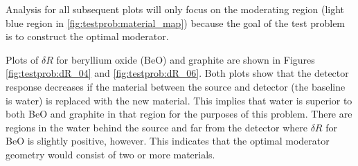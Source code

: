 Analysis for all subsequent plots will only focus on the moderating region (light blue region in \ref{fig:testprob:material_map}) because the goal of the test problem is to construct the optimal moderator.

Plots of $\delta R$ for beryllium oxide (BeO) and graphite are shown in Figures \ref{fig:testprob:dR_04} and \ref{fig:testprob:dR_06}.
Both plots show that the detector response decreases if the material between the source and detector (the baseline is water) is replaced with the new material.
This implies that water is superior to both BeO and graphite in that region for the purposes of this problem.
There are regions in the water behind the source and far from the detector where $\delta R$ for BeO is slightly positive, however.
This indicates that the optimal moderator geometry would consist of two or more materials.

